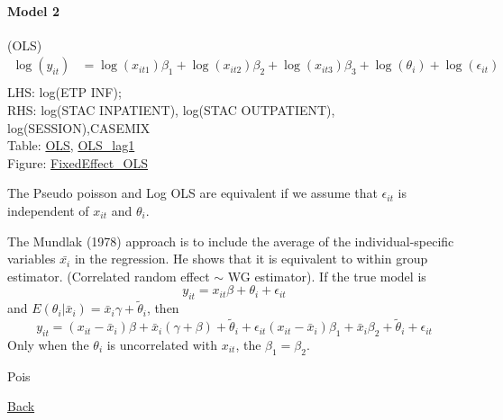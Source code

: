 \paragraph{Model 2} (OLS)
\begin{align*}
    \log(y_{it}) & =\log(x_{it1})\beta_1+\log(x_{it2})\beta_2+\log(x_{it3})\beta_3+\log(\theta_i)+\log(\epsilon_{it}) \\
\end{align*}
LHS: log(ETP INF); \\ RHS: log(STAC INPATIENT), log(STAC OUTPATIENT),
log(SESSION),CASEMIX
\\Table: \hyperlink{reg_inf_ols_2022}{OLS},
\hyperlink{reg_inf_lag_2022}{OLS\_lag1}
\\Figure: \hyperlink{FE_OLS_FI}{FixedEffect\_OLS}

\begin{remark}
    The Pseudo poisson and Log OLS are equivalent if we assume that $\epsilon_{it}$ is independent of $x_{it}$ and $\theta_i$.
\end{remark}

\begin{remark}
    The Mundlak (1978) approach is to include the average of the individual-specific variables $\bar{x_i}$ in the regression. He shows that it is equivalent to within group estimator.
    (Correlated random effect $\sim$ WG estimator). If the true model is \begin{equation*}
        y_{it}=x_{it}\beta+\theta_i+\epsilon_{it}
    \end{equation*} and $E(\theta_i|\bar{x}_i)=\bar{x}_i\gamma+\tilde{\theta}_i$, then
    \begin{equation*}
        y_{it}=(x_{it}-\bar{x}_i)\beta+\bar{x}_i(\gamma+\beta)+\tilde{\theta}_i+\epsilon_{it}
        (x_{it}-\bar{x}_i)\beta_1+\bar{x}_i\beta_2+\tilde{\theta}_i+\epsilon_{it}
    \end{equation*}
    Only when the $\theta_i$ is uncorrelated with $x_{it}$, the $\beta_1 = \beta_2$.
\end{remark}

\hypertarget{reg_inf_pois_2022}{Pois}

\hyperlink{home}{Back}
\bigskip

